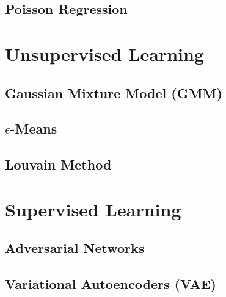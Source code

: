 \subsection{Poisson Regression}
\label{additional:Regression:poisson}

\section{Unsupervised Learning}
\label{additional:unsupervised}

\subsection{Gaussian Mixture Model (GMM)}
\label{additional:unsupervised:GMM}

\subsection{\texorpdfstring{$\epsilon$}{epsilon}-Means}
\label{additional:unsupervised:epsilonMean}

\subsection{Louvain Method}
\label{additional:unsupervised:louvain}

\section{Supervised Learning}
\label{additional:supervised}

\subsection{Adversarial Networks} %
\label{additional:supervised:AN}

\subsection{Variational Autoencoders (VAE)}
\label{additional:supervised:VAE}

